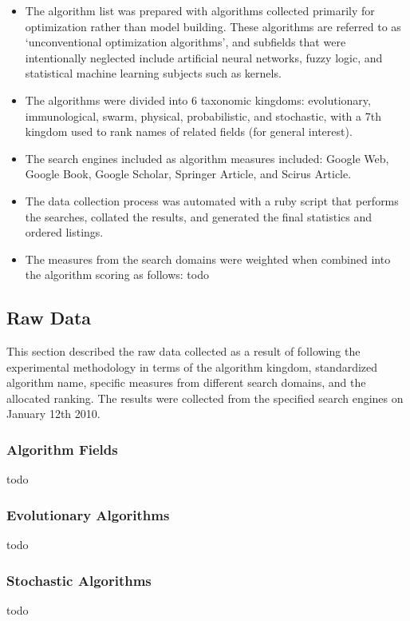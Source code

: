 \documentclass[a4paper, 11pt]{article}
\begin{document}
\begin{itemize}
	\item The algorithm list was prepared with algorithms collected primarily for optimization rather than model building. These algorithms are referred to as `unconventional optimization algorithms', and subfields that were intentionally neglected include artificial neural networks, fuzzy logic, and statistical machine learning subjects such as kernels.
	\item The algorithms were divided into 6 taxonomic kingdoms: evolutionary, immunological, swarm, physical, probabilistic, and stochastic, with a 7th kingdom used to rank names of related fields (for general interest).
	\item The search engines included as algorithm measures included: Google Web, Google Book, Google Scholar, Springer Article, and Scirus Article.
	\item The data collection process was automated with a ruby script that performs the searches, collated the results, and generated the final statistics and ordered listings.
	\item The measures from the search domains were weighted when combined into the algorithm scoring as follows: todo
\end{itemize}

% 
% 
\subsection{Raw Data}
This section described the raw data collected as a result of following the experimental methodology in terms of the algorithm kingdom, standardized algorithm name, specific measures from different search domains, and the allocated ranking. The results were collected from the specified search engines on January 12th 2010.

\subsubsection{Algorithm Fields}
todo

\subsubsection{Evolutionary Algorithms}
todo

\subsubsection{Stochastic Algorithms}
todo
\end{document}
